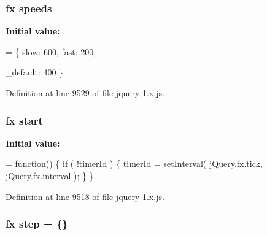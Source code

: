 \subsubsection[{\texorpdfstring{speeds}{speeds}}]{ {\bf fx} speeds}\hypertarget{jquery-1_8x_8js_a1079544ab08b6d4ca1692ce090f6ea2d}{}\label{jquery-1_8x_8js_a1079544ab08b6d4ca1692ce090f6ea2d}
{\bfseries Initial value\+:}
\begin{DoxyCode}
= \{
    slow: 600,
    fast: 200,
    
    \_default: 400
\}
\end{DoxyCode}


Definition at line 9529 of file jquery-\/1.\+x.\+js.

\subsubsection[{\texorpdfstring{start}{start}}]{ {\bf fx} start}\hypertarget{jquery-1_8x_8js_aef10902ffededd983608fdb8dbfc441a}{}\label{jquery-1_8x_8js_aef10902ffededd983608fdb8dbfc441a}
{\bfseries Initial value\+:}
\begin{DoxyCode}
= \textcolor{keyword}{function}() \{
    \textcolor{keywordflow}{if} ( !\hyperlink{jquery-1_8x_8js_aa447439fbe7027e58837a297297c9d8a}{timerId} ) \{
        \hyperlink{jquery-1_8x_8js_aa447439fbe7027e58837a297297c9d8a}{timerId} = setInterval( \hyperlink{jquery-1_8x_8js_a2b1d6f9c448e3ce72f4e1865d6e38d2c}{jQuery}.fx.tick, \hyperlink{jquery-1_8x_8js_a2b1d6f9c448e3ce72f4e1865d6e38d2c}{jQuery}.fx.interval );
    \}
\}
\end{DoxyCode}


Definition at line 9518 of file jquery-\/1.\+x.\+js.

\subsubsection[{\texorpdfstring{step}{step}}]{ {\bf fx} step = \{\}}\hypertarget{jquery-1_8x_8js_a7337229078e935a813e7e0f674fad739}{}\label{jquery-1_8x_8js_a7337229078e935a813e7e0f674fad739}


